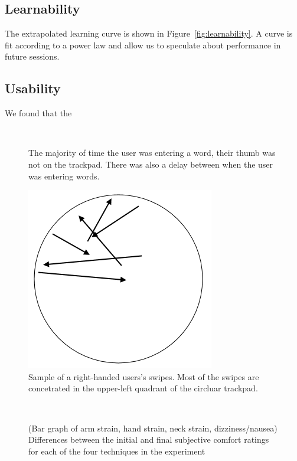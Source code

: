 \subsection{Learnability}
The extrapolated learning curve is shown in Figure~\ref{fig:learnability}.
A curve is fit according to a power law and allow us to speculate about performance in future sessions.

\subsection{Usability}
We found that the 

\begin{figure}
\centering
  \caption{The majority of time the user was entering a word, their thumb was not on the trackpad.  There was also a delay between when the user was entering words.
    }
  ~\label{fig:distance}
  \end{figure}

\begin{figure}
\centering
\includegraphics[width=0.5\columnwidth]{figures/circle}
  \caption{Sample of a right-handed users's swipes.  Most of the swipes are concetrated in the upper-left quadrant of the circluar trackpad.}

\label{fig:circle}

\end{figure}

\begin{figure}
\centering
{}


  \caption{(Bar graph of arm strain, hand strain, neck strain, dizziness/nausea)  Differences between the initial and final subjective comfort ratings for each of the four techniques in the experiment 
}~\label{fig:graphLearning}
\end{figure}

